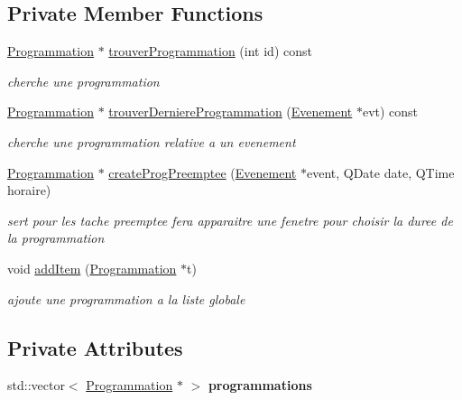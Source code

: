 \subsection*{Private Member Functions}
\begin{DoxyCompactItemize}
\item 
\hyperlink{class_programmation}{Programmation} $\ast$ \hyperlink{class_programmation_manager_a7bb1d14ed92cf719d2eb8952b5c59dd9}{trouver\+Programmation} (int id) const 
\begin{DoxyCompactList}\small\item\em cherche une programmation \end{DoxyCompactList}\item 
\hyperlink{class_programmation}{Programmation} $\ast$ \hyperlink{class_programmation_manager_a39d428d422191a382fa4365e0f3e4b04}{trouver\+Derniere\+Programmation} (\hyperlink{class_evenement}{Evenement} $\ast$evt) const 
\begin{DoxyCompactList}\small\item\em cherche une programmation relative a un evenement \end{DoxyCompactList}\item 
\hyperlink{class_programmation}{Programmation} $\ast$ \hyperlink{class_programmation_manager_a8f25dc83efdf00ab879df4f73fdad51f}{create\+Prog\+Preemptee} (\hyperlink{class_evenement}{Evenement} $\ast$event, Q\+Date date, Q\+Time horaire)
\begin{DoxyCompactList}\small\item\em sert pour les tache preemptee fera apparaitre une fenetre pour choisir la duree de la programmation \end{DoxyCompactList}\item 
void \hyperlink{class_programmation_manager_a3e84c7978bdce13ddcaef7e706ac2d49}{add\+Item} (\hyperlink{class_programmation}{Programmation} $\ast$t)
\begin{DoxyCompactList}\small\item\em ajoute une programmation a la liste globale \end{DoxyCompactList}\end{DoxyCompactItemize}
\subsection*{Private Attributes}
\begin{DoxyCompactItemize}
\item 
\hypertarget{class_programmation_manager_a2c28e7737241fc6612daccaca5b512e8}{}std\+::vector$<$ \hyperlink{class_programmation}{Programmation} $\ast$ $>$ {\bfseries programmations}\label{class_programmation_manager_a2c28e7737241fc6612daccaca5b512e8}

\end{DoxyCompactItemize}
